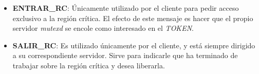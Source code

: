 \begin{itemize}
\item \textbf{ENTRAR\_RC}: Únicamente utilizado por el cliente para pedir
acceso exclusivo a la región crítica. El efecto de este mensaje es hacer que el 
propio servidor \emph{mutexd} se encole como interesado en el \emph{TOKEN}.

\item \textbf{SALIR\_RC}: Es utilizado únicamente por el cliente, y está
siempre dirigido a su correspondiente servidor. Sirve para indicarle que ha
terminado de trabajar sobre la región crítica y desea liberarla.

\end{itemize}

